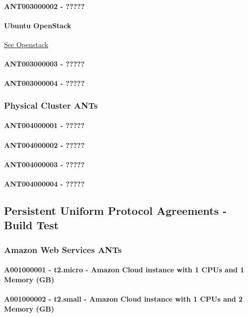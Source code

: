 \documentclass{acm_proc_article-sp}
\begin{document}
\paragraph{ANT003000002 - ?????}
\paragraph{Ubuntu OpenStack} 
\href{http://www.ubuntu.com/download/cloud/install-ubuntu-openstack}{See Openstack}
\paragraph{ANT003000003 - ?????}
\paragraph{ANT003000004 - ?????}
\subsubsection{Physical Cluster ANTs}
\paragraph{ANT004000001 - ?????}
\paragraph{ANT004000002 - ?????}
\paragraph{ANT004000003 - ?????}
\paragraph{ANT004000004 - ?????}
\subsection{Persistent Uniform Protocol Agreements - Build Test}
\subsubsection{Amazon Web Services ANTs}
\paragraph{A001000001 - t2.micro - Amazon Cloud instance with 1 CPUs and 1 Memory (GB)}
\paragraph{A001000002 - t2.small - Amazon Cloud instance with 1 CPUs and 2 Memory (GB)}
\end{document}
